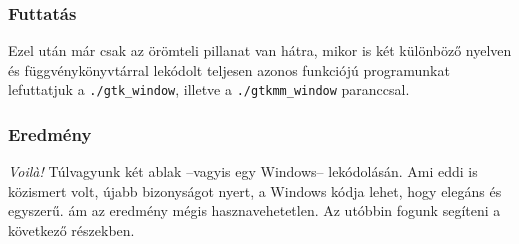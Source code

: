 \subsubsection{Futtatás}

Ezel után már csak az örömteli pillanat van hátra, mikor is két különböző nyelven és függvénykönyvtárral lekódolt teljesen azonos funkciójú programunkat lefuttatjuk a \texttt{./gtk\_window}, illetve a \texttt{./gtkmm\_window} paranccsal.

\subsubsection{Eredmény}

\textit{Voil\`{a}!} Túlvagyunk két ablak --vagyis egy Windows-- lekódolásán. Ami eddi is közismert volt, újabb bizonyságot nyert, a Windows kódja lehet, hogy elegáns és egyszerű. ám az eredmény mégis hasznavehetetlen. Az utóbbin fogunk segíteni a következő részekben.
